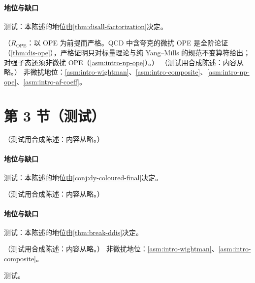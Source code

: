 \paragraph{地位与缺口}测试：本陈述的地位由\cref{thm:disall-factorization}决定。

\begin{proposition}\label{prop:coll-photon-sf}
（$R_{\mathrm{OPE}}$：以 OPE 为前提而严格。QCD 中含夸克的微扰 OPE 是全阶论证（\cref{thm:dis-ope}），严格证明只对标量理论与纯 Yang--Mills 的规范不变算符给出；对强子态还须非微扰 OPE（\cref{asm:intro-np-ope}）。）
（测试用合成陈述：内容从略。）
非微扰地位：\cref{asm:intro-wightman}、\cref{asm:intro-composite}、\cref{asm:intro-np-ope}、\cref{asm:intro-af-coeff}。
\end{proposition}

\section{第 3 节（测试）}\label{sec:coll-photo}

\begin{conjecture}\label{conj:coll-resolved-photo}
（测试用合成陈述：内容从略。）
\end{conjecture}
\paragraph{地位与缺口}测试：本陈述的地位由\cref{conj:dy-coloured-final}决定。

\begin{proposition}\label{prop:coll-diffractive-photo}
（测试用合成陈述：内容从略。）
\end{proposition}
\paragraph{地位与缺口}测试：本陈述的地位由\cref{thm:break-ddis}决定。

\begin{proposition}\label{prop:coll-luxqed}
（测试用合成陈述：内容从略。）
非微扰地位：\cref{asm:intro-wightman}、\cref{asm:intro-composite}。
\end{proposition}
\begin{proofsketch}测试。\end{proofsketch}
